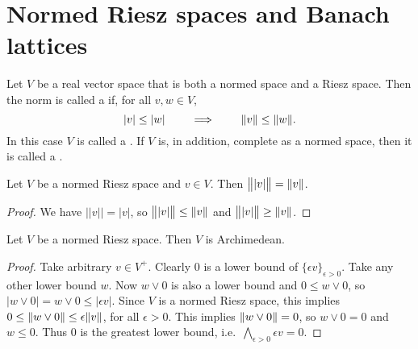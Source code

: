\section{Normed Riesz spaces and Banach lattices}
\begin{definition}
Let $V$ be a real vector space that is both a normed space and a Riesz space. Then the norm is called a  if, for all $v,w\in V$,
\[ |v|\leq |w| \qquad\implies\qquad \norm{v} \leq \norm{w}. \]
In this case $V$ is called a . If $V$ is, in addition, complete as a normed space, then it is called a .
\end{definition}

\begin{lemma} \label{normAbsoluteValue}
Let $V$ be a normed Riesz space and $v\in V$. Then $\norm[\big]{|v|} = \norm{v}$.
\end{lemma}
\begin{proof}
We have $\big||v|\big| = |v|$, so $\norm[\big]{|v|} \leq \norm{v}$ and $\norm[\big]{|v|} \geq \norm{v}$.
\end{proof}

\begin{proposition} \label{normedRieszSpaceArchimedean}
Let $V$ be a normed Riesz space. Then $V$ is Archimedean.
\end{proposition}
\begin{proof}
Take arbitrary $v\in V^+$. Clearly $0$ is a lower bound of $\{\epsilon v\}_{\epsilon > 0}$. Take any other lower bound $w$. Now $w\vee 0$ is also a lower bound and $0\leq w\vee 0$, so $|w\vee 0| = w\vee 0 \leq |\epsilon v|$. Since $V$ is a normed Riesz space, this implies $0\leq \norm{w\vee 0} \leq \epsilon \norm{v}$, for all $\epsilon >0$. This implies $\norm{w\vee 0} = 0$, so $w\vee 0 = 0$ and $w\leq 0$. Thus $0$ is the greatest lower bound, i.e.\ $\bigwedge_{\epsilon >0}\epsilon v = 0$.
\end{proof}

